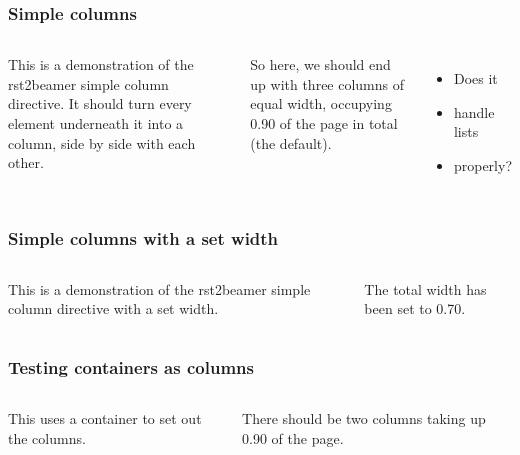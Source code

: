 \documentclass[t]{beamer}
\begin{document}
\begin{frame}[fragile]
\frametitle{Simple columns}

\begin{columns}[T]

This is a demonstration of the rst2beamer simple column directive. It
should turn every element underneath it into a column, side by side with
each other.


So here, we should end up with three columns of equal width, occupying 0.90
of the page in total (the default).

\begin{itemize}[<+-| alert@+>]

\item Does it

\item handle lists

\item properly?
\end{itemize}

\end{columns}

\end{frame}

\begin{frame}[fragile]
\frametitle{Simple columns with a set width}

\begin{columns}[T]

This is a demonstration of the rst2beamer simple column directive with a
set width.


The total width has been set to 0.70.

\end{columns}

\end{frame}

\begin{frame}[fragile]
\frametitle{Testing containers as columns}

\begin{columns}[T]

This uses a container to set out the columns.


There should be two columns taking up 0.90 of the page.

\end{columns}

\end{frame}
\end{document}
